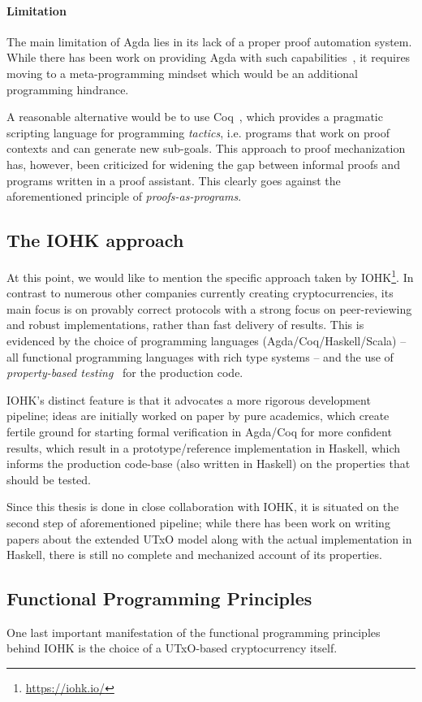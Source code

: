 \documentclass[acmsmall,nonacm=true,screen=true]{acmart}
\newcommand\site[1]{\footnote{\url{#1}}}
\begin{document}
\paragraph{Limitation}
The main limitation of Agda lies in its lack of a proper proof automation system.
While there has been work on providing Agda with such capabilities~\cite{agdaauto},
it requires moving to a meta-programming mindset which would be an additional programming hindrance.

A reasonable alternative would be to use Coq~\cite{coq}, which provides a pragmatic
scripting language for programming \textit{tactics}, i.e. programs that work on proof contexts and can
generate new sub-goals.
This approach to proof mechanization has, however, been criticized for widening the gap between informal proofs
and programs written in a proof assistant.
This clearly goes against the aforementioned principle of \textit{proofs-as-programs}.

\subsection{The IOHK approach}
At this point, we would like to mention the specific approach taken by IOHK\site{https://iohk.io/}.
In contrast to numerous other companies currently creating cryptocurrencies, its main focus
is on provably correct protocols with a strong focus on peer-reviewing and robust implementations, rather
than fast delivery of results.
This is evidenced by the choice of programming languages (Agda/Coq/Haskell/Scala)
-- all functional programming languages with rich type systems --
and the use of \textit{property-based testing}~\cite{quickcheck} for the production code.

IOHK's distinct feature is that it advocates a more rigorous development pipeline;
ideas are initially worked on paper by pure academics,
which create fertile ground for starting formal verification in Agda/Coq for more confident results, 
which result in a prototype/reference implementation in Haskell,
which informs the production code-base (also written in Haskell) on the properties that should be tested.

Since this thesis is done in close collaboration with IOHK, it is situated on the second step of aforementioned pipeline;
while there has been work on writing papers about the extended UTxO model along with the actual implementation in Haskell,
there is still no complete and mechanized account of its properties.

\subsection{Functional Programming Principles}
One last important manifestation of the functional programming principles behind IOHK is the choice
of a UTxO-based cryptocurrency itself.
\end{document}
